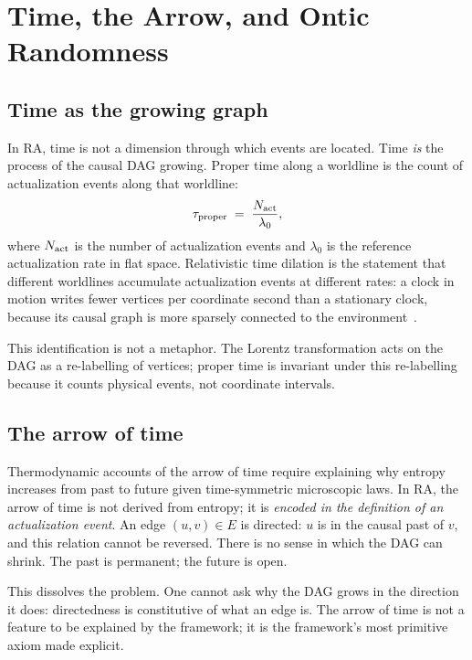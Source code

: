 \documentclass[11pt,twocolumn]{article}
\theoremstyle{plain}
\theoremstyle{remark}
\begin{document}
\section{Time, the Arrow, and Ontic Randomness}
\label{sec:time}

\subsection{Time as the growing graph}

In RA, time is not a dimension through which events are located.
Time \emph{is} the process of the causal DAG growing.
Proper time along a worldline is the count of actualization events
along that worldline:
\begin{equation}
  \tau_{\rm proper} \;=\; \frac{N_{\rm act}}{\lambda_0},
  \label{eq:proper_time}
\end{equation}
where $N_{\rm act}$ is the number of actualization events and
$\lambda_0$ is the reference actualization rate in flat space.
Relativistic time dilation is the statement that different worldlines
accumulate actualization events at different rates: a clock in
motion writes fewer vertices per coordinate second than a stationary
clock, because its causal graph is more sparsely connected to the
environment~\cite{Sandeman2026P3}.

This identification is not a metaphor.
The Lorentz transformation acts on the DAG as a re-labelling of
vertices; proper time is invariant under this re-labelling because
it counts physical events, not coordinate intervals.

\subsection{The arrow of time}

Thermodynamic accounts of the arrow of time require explaining why
entropy increases from past to future given time-symmetric
microscopic laws.
In RA, the arrow of time is not derived from entropy; it is
\emph{encoded in the definition of an actualization event}.
An edge $(u, v) \in E$ is directed: $u$ is in the causal past of
$v$, and this relation cannot be reversed.
There is no sense in which the DAG can shrink.
The past is permanent; the future is open.

This dissolves the problem.
One cannot ask why the DAG grows in the direction it does:
directedness is constitutive of what an edge is.
The arrow of time is not a feature to be explained by the framework;
it is the framework's most primitive axiom made explicit.
\end{document}
